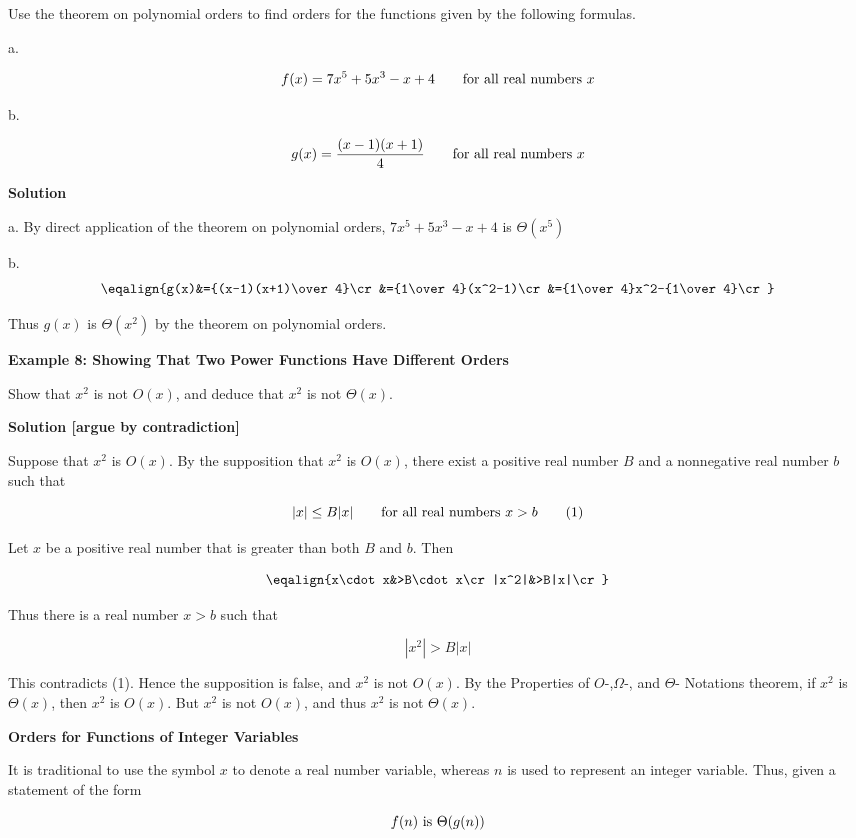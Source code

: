 \vskip 1mm
Use the theorem on polynomial orders to find orders for the functions given by the following formulas.

\vskip 3mm
a.

$$f(x)=7x^5+5x^3-x+4\qquad\hbox{for all real numbers $x$}$$

b.

$$g(x)={(x-1)(x+1)\over 4}\qquad\hbox{for all real numbers $x$}$$

\vskip 3mm
{\bf Solution}

\vskip 1mm
a. By direct application of the theorem on polynomial orders, $7x^5+5x^3-x+4$ is $\Theta(x^5)$

\vskip 3mm
b. $$\eqalign{g(x)&={(x-1)(x+1)\over 4}\cr
		&={1\over 4}(x^2-1)\cr
		&={1\over 4}x^2-{1\over 4}\cr}$$

Thus $g(x)$ is $\Theta(x^2)$ by the theorem on polynomial orders.

\filbreak
\vskip 1cm
{\bf Example 8: Showing That Two Power Functions Have Different Orders}

\vskip 1mm
Show that $x^2$ is not $O(x)$, and deduce that $x^2$ is not $\Theta(x)$.

\vskip 3mm
{\bf Solution [argue by contradiction]}

\vskip 1mm
Suppose that $x^2$ is $O(x)$. By the supposition that $x^2$ is $O(x)$, there exist a positive real number $B$ and a nonnegative real number $b$ such that

$$|x|\leq B|x|\qquad\hbox{for all real numbers $x>b$}\qquad\hbox{(1)}$$

Let $x$ be a positive real number that is greater than both $B$ and $b$. Then

$$\eqalign{x\cdot x&>B\cdot x\cr
	|x^2|&>B|x|\cr}$$

Thus there is a real number $x>b$ such that

$$|x^2|>B|x|$$

This contradicts (1). Hence the supposition is false, and $x^2$ is not $O(x)$. By the Properties of $O$-,$\Omega$-, and $\Theta$- Notations theorem, if $x^2$ is $\Theta(x)$, then $x^2$ is $O(x)$. But $x^2$ is not $O(x)$, and thus $x^2$ is not $\Theta(x)$.

\filbreak
\vskip 1cm
{\bf Orders for Functions of Integer Variables}

\vskip 1mm
It is traditional to use the symbol $x$ to denote a real number variable, whereas $n$ is used to represent an integer variable. Thus, given a statement of the form

$$f(n)\hbox{ is } \Theta(g(n))$$

